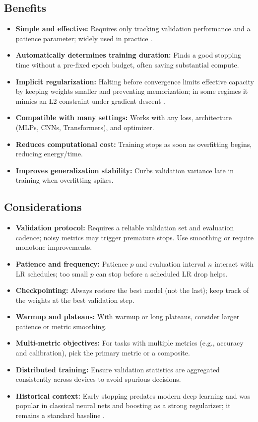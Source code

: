 \subsection{Benefits}

\begin{itemize}
    \item \textbf{Simple and effective:} Requires only tracking validation performance and a patience parameter; widely used in practice \cite{GoodfellowEtAl2016,Prince2023}.
    \item \textbf{Automatically determines training duration:} Finds a good stopping time without a pre-fixed epoch budget, often saving substantial compute.
    \item \textbf{Implicit regularization:} Halting before convergence limits effective capacity by keeping weights smaller and preventing memorization; in some regimes it mimics an L2 constraint under gradient descent \cite{GoodfellowEtAl2016}.
    \item \textbf{Compatible with many settings:} Works with any loss, architecture (MLPs, CNNs, Transformers), and optimizer.
    \item \textbf{Reduces computational cost:} Training stops as soon as overfitting begins, reducing energy/time.
    \item \textbf{Improves generalization stability:} Curbs validation variance late in training when overfitting spikes.
\end{itemize}

\subsection{Considerations}

\begin{itemize}
    \item \textbf{Validation protocol:} Requires a reliable validation set and evaluation cadence; noisy metrics may trigger premature stops. Use smoothing or require monotone improvements.
    \item \textbf{Patience and frequency:} Patience $p$ and evaluation interval $n$ interact with LR schedules; too small $p$ can stop before a scheduled LR drop helps.
    \item \textbf{Checkpointing:} Always restore the best model (not the last); keep track of the weights at the best validation step.
    \item \textbf{Warmup and plateaus:} With warmup or long plateaus, consider larger patience or metric smoothing.
    \item \textbf{Multi-metric objectives:} For tasks with multiple metrics (e.g., accuracy and calibration), pick the primary metric or a composite.
    \item \textbf{Distributed training:} Ensure validation statistics are aggregated consistently across devices to avoid spurious decisions.
    \item \textbf{Historical context:} Early stopping predates modern deep learning and was popular in classical neural nets and boosting as a strong regularizer; it remains a standard baseline \cite{GoodfellowEtAl2016,Bishop2006}.
\end{itemize}

